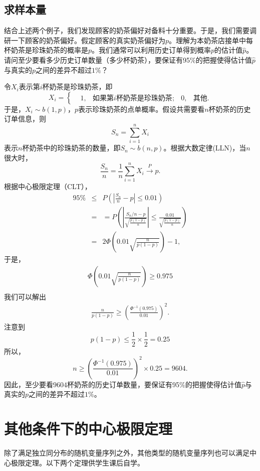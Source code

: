 \subsection{求样本量}
\begin{example}
    结合上述两个例子，我们发现顾客的奶茶偏好对备料十分重要。于是，我们需要调研一下顾客的奶茶偏好。假定顾客的真实奶茶偏好为$p$。理解为本奶茶店接单中每杯奶茶是珍珠奶茶的概率是$p$。我们通常可以利用历史订单得到概率$p$的估计值$\hat{p}$。请问至少要看多少历史订单数量（多少杯奶茶），要保证有95$\%$的把握使得估计值$\hat{p}$与真实的$p$之间的差异不超过$1\%$？
\end{example}
\begin{solution}
令$X_i$表示第$i$杯奶茶是珍珠奶茶，即
$$
X_i = \left\{
\begin{aligned}
&1,& \text{如果第$i$杯奶茶是珍珠奶茶};
&0,& \text{其他}.
\end{aligned}
\right.
$$
于是，$X_i \sim b(1,p)$，$p$表示珍珠奶茶的点单概率。假设共需要看$n$杯奶茶的历史订单信息，则
$$
S_n = \sum_{i=1}^n X_i
$$
表示$n$杯奶茶中的珍珠奶茶的数量，即$S_n \sim b(n,p)$。根据大数定律(LLN)，当$n$很大时，$$
\frac{S_n}{n} = \frac{1}{n} \sum_{i=1}^n X_i \overset{P}{\rightarrow} p.
$$
根据中心极限定理（CLT），
\begin{eqnarray*}
    95\% &\leq&  P\left(\left|\frac{S_{n}}{n}-p\right| \leqslant 0.01 \right)\\
    &=&=P\left(\left|\frac{S_{n} / n-p}{\sqrt{\frac{p(1-p)}{n}}}\right| \leq \frac{0.01}{\sqrt{\frac{p(1-p)}{n}}}\right) \\
    &=& 2 \Phi\left(0.01 \sqrt{\frac{n}{p(1-p)}}\right)-1,
\end{eqnarray*}
于是，
\begin{eqnarray*}
    \Phi\left(0.01 \sqrt{\frac{n}{p(1-p)}}\right) \geq 0.975\\
\end{eqnarray*}
我们可以解出
\begin{eqnarray*}
    \frac{n}{p(1-p)} \geq \left(\frac{\Phi^{-1}(0.975)}{0.01}\right)^2.
\end{eqnarray*}
注意到
$$
p(1-p) \leqslant \frac{1}{2} \times \frac{1}{2}=0.25
$$
所以，$$
n \geq \left(\frac{\Phi^{-1}(0.975)}{0.01}\right)^2 \times 0.25 = 9604.
$$
因此，至少要看$9604$杯奶茶的历史订单数量，要保证有95$\%$的把握使得估计值$\hat{p}$与真实的$p$之间的差异不超过$1\%$。
\end{solution}

\section{其他条件下的中心极限定理}
除了满足独立同分布的随机变量序列之外，其他类型的随机变量序列也可以满足中心极限定理。以下两个定理供学生课后自学。

